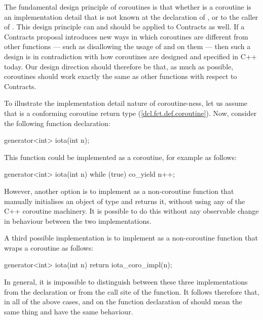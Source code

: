 The fundamental design principle of coroutines is that whether  is a coroutine is an implementation detail that is not known at the declaration of , or to the caller of . This design principle can and should be applied to Contracts as well. If a Contracts proposal introduces new ways in which coroutines are different from other functions --- such as disallowing the usage of  and  on them --- then such a design is in contradiction with how coroutines are designed and specified in C++ today. Our design direction should therefore be that, as much as possible, coroutines should work exactly the same as other functions with respect to Contracts.

To illustrate the implementation detail nature of coroutine-ness, let us assume that  is a conforming coroutine return type (\href{https://eel.is/c++draft/dcl.fct.def.coroutine}{[dcl.fct.def.coroutine]}). Now, consider the following function declaration:
\begin{codeblock}
generator<int> iota(int n); 
\end{codeblock}
This function could be implemented as a coroutine, for example as follows:
\begin{codeblock}
generator<int> iota(int n) {
  while (true)
    co_yield n++;
}
\end{codeblock}
However, another option is to implement  as a non-coroutine function that manually initialises an object of type  and returns it, without using any of the C++ coroutine machinery. It is possible to do this without any observable change in behaviour between the two implementations.

A third possible implementation is to implement  as a non-coroutine function that wraps a coroutine  as follows:
\begin{codeblock}
generator<int> iota(int n) {
  return iota_coro_impl(n);
}
\end{codeblock}
In general, it is impossible to distinguish between these three implementations from the declaration or from the call site of the function. It follows therefore that, in all of the above cases,  and  on the function declaration of  should mean the same thing and have the same behaviour.

